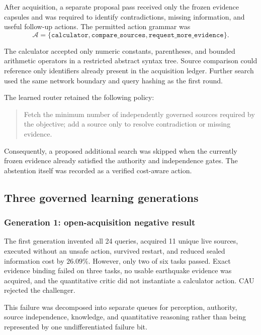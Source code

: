 After acquisition, a separate proposal pass received only the frozen evidence
capsules and was required to identify contradictions, missing information, and
useful follow-up actions.  The permitted action grammar was
\begin{equation}
\mathcal{A}=\{\texttt{calculator},\texttt{compare\_sources},
\texttt{request\_more\_evidence}\}.
\label{eq:arena-v2-action-set}
\end{equation}

The calculator accepted only numeric constants, parentheses, and bounded
arithmetic operators in a restricted abstract syntax tree.  Source comparison
could reference only identifiers already present in the acquisition ledger.
Further search used the same network boundary and query hashing as the first
round.

The learned router retained the following policy:
\begin{quote}
Fetch the minimum number of independently governed sources required by the
objective; add a source only to resolve contradiction or missing evidence.
\end{quote}
Consequently, a proposed additional search was skipped when the currently
frozen evidence already satisfied the authority and independence gates.  The
abstention itself was recorded as a verified cost-aware action.


\subsection{Three governed learning generations}
\label{subsec:arena-v2-generations}

\subsubsection{Generation 1: open-acquisition negative result}

The first generation invented all 24 queries, acquired 11 unique live sources,
executed without an unsafe action, survived restart, and reduced sealed
information cost by $26.09\%$.  However, only two of six tasks passed.  Exact
evidence binding failed on three tasks, no usable earthquake evidence was
acquired, and the quantitative critic did not instantiate a calculator action.
CAU rejected the challenger.

This failure was decomposed into separate queues for perception, authority,
source independence, knowledge, and quantitative reasoning rather than being
represented by one undifferentiated failure bit.

